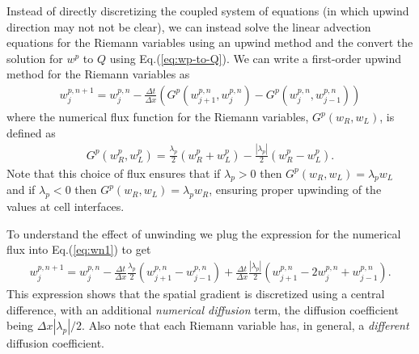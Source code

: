 \documentclass[12pt]{article}
\theoremstyle{definition}
\theoremstyle{definition}
\theoremstyle{definition}
\newcommand{\eqr}[1]{Eq.\thinspace(#1)}
\begin{document}
Instead of directly discretizing the coupled system of equations (in
which upwind direction may not not be clear), we can instead solve the
linear advection equations for the Riemann variables using an upwind
method and the convert the solution for $w^p$ to $Q$ using
\eqr{\ref{eq:wp-to-Q}}. We can write a first-order upwind method for
the Riemann variables as
\begin{align}
w^{p,n+1}_j = w^{p,n}_j - \frac{\Delta t}{\Delta x}
\left(
G^p(w^{p,n}_{j+1},w^{p,n}_{j}) - G^p(w^{p,n}_{j},w^{p,n}_{j-1})
\right) \label{eq:wn1}
\end{align}
where the numerical flux function for the Riemann variables,
$G^p(w_R,w_L)$, is defined as
\begin{align}
G^p(w_R^p,w_L^p) = \frac{\lambda_p}{2}(w_R^p + w_L^p) - \frac{|\lambda_p|}{2}(w_R^p - w_L^p).
\end{align}
Note that this choice of flux ensures that if $\lambda_p>0$ then
$G^p(w_R,w_L) = \lambda_p w_L$ and if $\lambda_p < 0$ then
$G^p(w_R,w_L) = \lambda_p w_R$, ensuring proper upwinding of the
values at cell interfaces.

To understand the effect of unwinding we plug the expression for the
numerical flux into \eqr{\ref{eq:wn1}} to get
\begin{align}
w^{p,n+1}_j = w^{p,n}_j 
- \frac{\Delta t}{\Delta x}\frac{\lambda_p}{2} \left(w^{p,n}_{j+1}-w^{p,n}_{j-1} \right)
+ \frac{\Delta t}{\Delta x}
\frac{|\lambda_p|}{2} \left(w^{p,n}_{j+1} - 2 w^{p,n}_{j}  + w^{p,n}_{j-1} \right).
\end{align}
This expression shows that the spatial gradient is discretized using a
central difference, with an additional \emph{numerical diffusion}
term, the diffusion coefficient being $\Delta x|\lambda_p|/2$. Also
note that each Riemann variable has, in general, a \emph{different}
diffusion coefficient.
\end{document}
